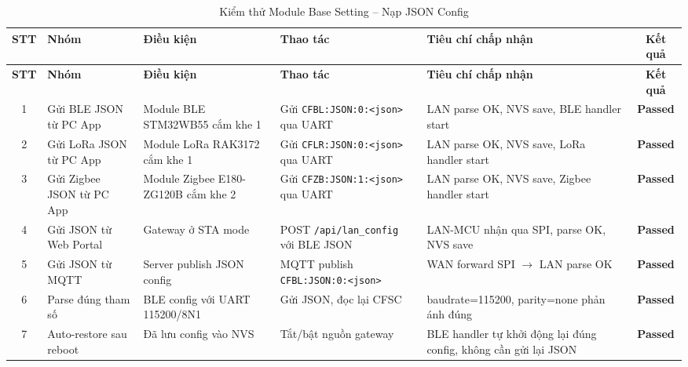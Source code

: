        \begin{longtable}{|c|p{2cm}|p{2.5cm}|p{3.5cm}|p{4cm}|c|}
            \caption{Kiểm thử Module Base Setting -- Nạp JSON Config}
            \label{tab:test_module_base_json} \\
            \hline
            \textbf{STT} & \textbf{Nhóm} & \textbf{Điều kiện} & \textbf{Thao tác} & \textbf{Tiêu chí chấp nhận} & \textbf{Kết quả} \\ \hline
            \endfirsthead
            \hline
            \textbf{STT} & \textbf{Nhóm} & \textbf{Điều kiện} & \textbf{Thao tác} & \textbf{Tiêu chí chấp nhận} & \textbf{Kết quả} \\ \hline
            \endhead
            \hline
            \endfoot
            \endlastfoot

            1 & Gửi BLE JSON từ PC App & Module BLE STM32WB55 cắm khe 1 & Gửi \texttt{CFBL:JSON:0:}\newline\texttt{<json>} qua UART & LAN parse OK, NVS save, BLE handler start & \textcolor{modern_blue}{\textbf{Passed}} \\ \hline
            2 & Gửi LoRa JSON từ PC App & Module LoRa RAK3172 cắm khe 1 & Gửi \texttt{CFLR:JSON:0:}\newline\texttt{<json>} qua UART & LAN parse OK, NVS save, LoRa handler start & \textcolor{modern_blue}{\textbf{Passed}} \\ \hline
            3 & Gửi Zigbee JSON từ PC App & Module Zigbee E180-ZG120B cắm khe 2 & Gửi \texttt{CFZB:JSON:1:}\newline\texttt{<json>} qua UART & LAN parse OK, NVS save, Zigbee handler start & \textcolor{modern_blue}{\textbf{Passed}} \\ \hline
            4 & Gửi JSON từ Web Portal & Gateway ở STA mode & POST \texttt{/api/}\newline\texttt{lan\_config} với BLE JSON & LAN-MCU nhận qua SPI, parse OK, NVS save & \textcolor{modern_blue}{\textbf{Passed}} \\ \hline
            5 & Gửi JSON từ MQTT & Server publish JSON config & MQTT publish \texttt{CFBL:JSON:0:}\newline\texttt{<json>} & WAN forward SPI $\rightarrow$ LAN parse OK & \textcolor{modern_blue}{\textbf{Passed}} \\ \hline
            6 & Parse đúng tham số & BLE config với UART 115200/8N1 & Gửi JSON, đọc lại CFSC & baudrate=115200, parity=none phản ánh đúng & \textcolor{modern_blue}{\textbf{Passed}} \\ \hline
            7 & Auto-restore sau reboot & Đã lưu config vào NVS & Tắt/bật nguồn gateway & BLE handler tự khởi động lại đúng config, không cần gửi lại JSON & \textcolor{modern_blue}{\textbf{Passed}} \\ \hline

\end{longtable}
